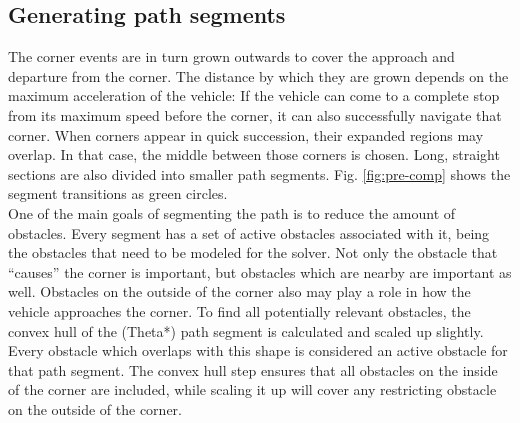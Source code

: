 \subsection{Generating path segments}
The corner events are in turn grown outwards to cover the approach and departure from the corner. The distance by which they are grown depends on the maximum acceleration of the vehicle: If the vehicle can come to a complete stop from its maximum speed before the corner, it can also successfully navigate that corner. When corners appear in quick succession, their expanded regions may overlap. In that case, the middle between those corners is chosen. Long, straight sections are also divided into smaller path segments. Fig. \ref{fig:pre-comp} shows the segment transitions as green circles.\\
One of the main goals of segmenting the path is to reduce the amount of obstacles. Every segment has a set of active obstacles associated with it, being the obstacles that need to be modeled for the solver. Not only the obstacle that ``causes'' the corner is important, but obstacles which are nearby are important as well. Obstacles on the outside of the corner also may play a role in how the vehicle approaches the corner. To find all potentially relevant obstacles, the convex hull of the (Theta*) path segment is calculated and scaled up slightly. Every obstacle which overlaps with this shape is considered an active obstacle for that path segment. The convex hull step ensures that all obstacles on the inside of the corner are included, while scaling it up will cover any restricting obstacle on the outside of the corner.

